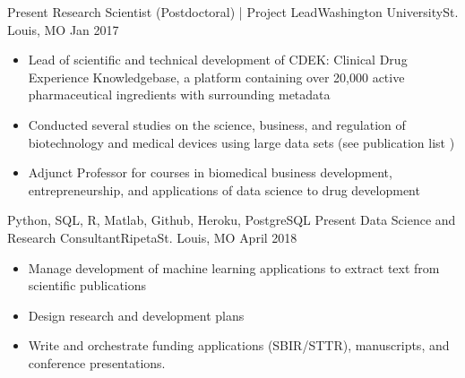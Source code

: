 %
%
%
\begin{experiences}
  \experience
    {Present}   {Research Scientist (Postdoctoral) | Project Lead}{Washington University}{St. Louis, MO}
    {Jan 2017} {
                      \begin{itemize}
                        \item Lead of scientific and technical development of CDEK: Clinical Drug Experience Knowledgebase, a platform containing over 20,000 active pharmaceutical ingredients with surrounding metadata             
                        \item Conducted several studies on the science, business, and regulation of biotechnology and medical devices using large data sets (see publication list \href{https://orcid.org/0000-0002-9352-9813}{\aiOrcid})
                        \item Adjunct Professor for courses in biomedical business development, entrepreneurship, and applications of data science to drug development                                                                
                      \end{itemize}
                    }
                    {Python, SQL, R, Matlab, Github, Heroku, PostgreSQL}
  \emptySeparator
    \experience
    {Present}   {Data Science and Research Consultant}{Ripeta}{St. Louis, MO}
    {April 2018} {
                      \begin{itemize}
                        \item Manage development of machine learning applications to extract text from scientific publications 
                        \item Design research and development plans \item Write and orchestrate funding applications (SBIR/STTR), manuscripts, and conference presentations.
                 

\end{itemize}}
\end{experiences}

